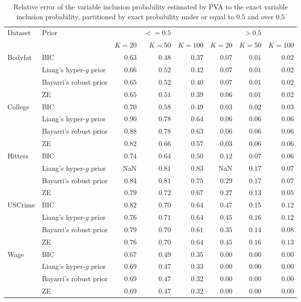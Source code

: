 \begin{table}[!ht]
{\scriptsize 
\begin{tabular}{|ll|rrr|rrr|}
	\hline
	Dataset & Prior & & $<=0.5$ & & & $>0.5$ &\\
	& & $K = 20$ & $K = 50$ & $K = 100$ & $K = 20$ & $K = 50$ & $K = 100$ \\
	\hline
	Bodyfat    &BIC                     &$0.63$&$0.48$&$0.37$&$0.07$&$0.01$&$0.02$\\
	           &Liang's hyper-$g$ prior &$0.66$&$0.52$&$0.42$&$0.07$&$0.01$&$0.02$\\
	           &Bayarri's robust prior  &$0.65$&$0.52$&$0.40$&$0.07$&$0.01$&$0.02$\\
	           &ZE                      &$0.65$&$0.51$&$0.39$&$0.06$&$0.01$&$0.02$\\
	College    &BIC                     &$0.70$&$0.58$&$0.49$&$0.03$&$0.02$&$0.03$\\
	&Liang's hyper-$g$ prior            &$0.90$&$0.78$&$0.64$&$0.06$&$0.06$&$0.06$\\
	&Bayarri's robust prior             &$0.88$&$0.78$&$0.63$&$0.06$&$0.06$&$0.06$\\
	&ZE                                 &$0.82$&$0.66$&$0.57$&$0.03$&$0.06$&$0.06$\\
	Hitters   &BIC                      &$0.74$&$0.64$&$0.50$&$0.12$&$0.07$&$0.06$\\
	&Liang's hyper-$g$ prior            & NaN  &$0.81$&$0.83$&NaN   &$0.17$&$0.07$\\
	&Bayarri's robust prior             &$0.84$&$0.81$&$0.75$&$0.29$&$0.17$&$0.07$\\
	&ZE                                 &$0.79$&$0.72$&$0.67$&$0.27$&$0.13$&$0.05$\\
	USCrime&BIC                         &$0.82$&$0.70$&$0.64$&$0.47$&$0.15$&$0.12$\\
	&Liang's hyper-$g$ prior            &$0.76$&$0.71$&$0.64$&$0.45$&$0.16$&$0.12$\\
	&Bayarri's robust prior             &$0.79$&$0.70$&$0.61$&$0.35$&$0.14$&$0.08$\\
	&ZE                                 &$0.76$&$0.70$&$0.64$&$0.45$&$0.16$&$0.13$\\
	Wage&BIC                            &$0.67$&$0.49$&$0.35$&$0.00$&$0.00$&$0.00$\\
	&Liang's hyper-$g$ prior            &$0.69$&$0.47$&$0.33$&$0.00$&$0.00$&$0.00$\\
	&Bayarri's robust prior             &$0.69$&$0.47$&$0.32$&$0.00$&$0.00$&$0.00$\\
	&ZE                                 &$0.69$&$0.47$&$0.32$&$0.00$&$0.00$&$0.00$\\
	\hline
\end{tabular}
}
\label{tab:variable_inclusion_rel_error}
\bigskip  
\caption{Relative error of the variable inclusion probability estimated by PVA to the
					exact variable inclusion probability, partitioned by exact probability under or equal to $0.5$ and
					over $0.5$}
\end{table}

